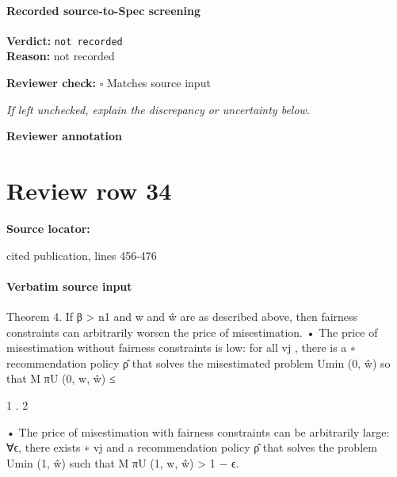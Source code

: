 \documentclass[10pt]{article}
\newcommand{\reviewerbox}{%
  \par\noindent\fbox{\parbox{0.96\linewidth}{\rule{0pt}{0.38in}}}\par
}
\newcommand{\reviewmatch}[1]{%
  \par\noindent\textbf{Reviewer check:} $\square$\; #1\par
  \noindent\emph{If left unchecked, explain the discrepancy or uncertainty below.}\par
}
\begin{document}
\paragraph{Recorded source-to-Spec screening}
\textbf{Verdict:} \texttt{not recorded}
\\
\textbf{Reason:} not recorded
\reviewmatch{Matches source input}
\noindent\textbf{Reviewer annotation}\par
\reviewerbox
\clearpage
\hypertarget{source-claim-c68da4ed1cd3be2b}{}
\section*{Review row 34}
\textbf{Source locator:} {\footnotesize\raggedright cited publication, lines 456-\allowbreak{}476\par}
\paragraph{Verbatim source input}
\begin{ReviewVerbatim}
Theorem 4. If β > n1 and w and ŵ are as described above, then fairness constraints can arbitrarily
worsen the price of misestimation.
• The price of misestimation without fairness constraints is low: for all {vj }, there is a
∗
recommendation policy ρ̂ that solves the misestimated problem Umin
(0, ŵ) so that
M
πU
(0, w, ŵ) ≤

1
.
2

• The price of misestimation with fairness constraints can be arbitrarily large: ∀ϵ, there exists
∗
{vj } and a recommendation policy ρ̂ that solves the problem Umin
(1, ŵ) such that
M
πU
(1, w, ŵ) > 1 − ϵ.
\end{ReviewVerbatim}
\end{document}
